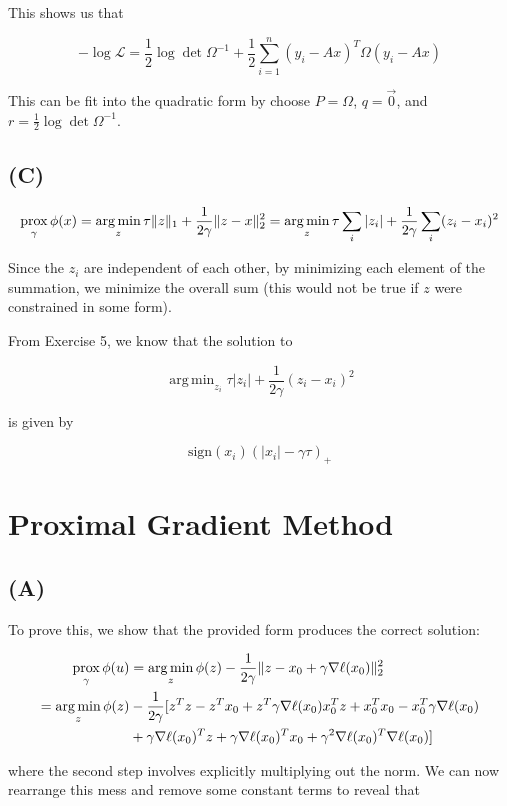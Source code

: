 \documentclass{article}
\DeclarePairedDelimiter\norm{\lVert}{\rVert}
\DeclareMathOperator*{\argmin}{arg\,min}
\newcommand{\prox}{ \mathop{\mathrm{prox}} }
\newcommand{\calL}{{\mathcal{L}}}
\begin{document}
This shows us that

\[
 - \log \calL =  \frac{1}{2} \log \det{\Omega^{-1}} + \frac{1}{2} \sum_{i=1}^n(y_i - Ax)^T
    \Omega(y_i - Ax)
\]

This can be fit into the quadratic form by choose $P = \Omega$, $q = \vec{0}$,
and $r = \frac{1}{2} \log \det{\Omega^{-1}}$.

\subsection*{(C)}

\[
\prox_\gamma \phi(x) = \argmin_z \tau \norm{z}_1 + \frac{1}{2\gamma} \norm{z-
  x}_2^2 = \argmin_z \tau \sum_i |z_i| + \frac{1}{2\gamma} \sum_i (z_i - x_i)^2
\]

Since the $z_i$ are independent of each other, by minimizing each element of the
summation, we minimize the overall sum (this would not be true if $z$ were
constrained in some form).

From Exercise 5, we know that the solution to

\[
 \argmin_{z_i} \tau |z_i| + \frac{1}{2\gamma} (z_i - x_i)^2
\]

is given by

\[
  \mathrm{sign}(x_i)(|x_i| - \gamma\tau)_{+}
\]


\section*{Proximal Gradient Method}

\subsection*{(A)}

To prove this, we show that the provided form produces the correct solution:

\begin{alignat*}{2}
  \prox_\gamma \phi(u)
  &= \argmin_z \phi(z) - \frac{1}{2\gamma} \norm{z - x_0 + \gamma \nabla
    \ell(x_0)}_2^2\\
  = \argmin_z \phi(z) &- \frac{1}{2\gamma} [ z^Tz - z^Tx_0 +
    z^T \gamma\nabla\ell(x_0)
    x_0^Tz + x_0^Tx_0 - x_0^T\gamma \nabla\ell(x_0)\\
    &+  \gamma \nabla \ell(x_0)^Tz + \gamma\nabla\ell(x_0)^Tx_0 +
    \gamma^2 \nabla\ell(x_0)^T\nabla\ell(x_0) ]
\end{alignat*}

where the second step involves explicitly multiplying out the norm. We can now
rearrange this mess and remove some constant terms to reveal that
\end{document}

